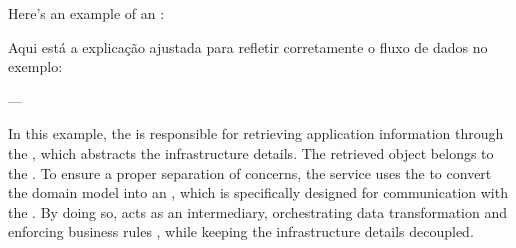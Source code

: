 \documentclass[letterpaper,10pt,english]{sphinxhowto}
\begin{document}
\sphinxAtStartPar
Here’s an example of an :

\begin{sphinxVerbatim}[commandchars=\\\{\}]
 
 
 


      
          

      
          
          
         
\end{sphinxVerbatim}

\sphinxAtStartPar
Aqui está a explicação ajustada para refletir corretamente o fluxo de dados no exemplo:

\sphinxAtStartPar
—

\sphinxAtStartPar
In this example, the  is responsible for retrieving application information through the , which abstracts the infrastructure details.
The retrieved  object belongs to the .
To ensure a proper separation of concerns, the service uses the  to convert the domain model into an , which is specifically designed for communication with the .
By doing so,  acts as an intermediary, orchestrating data transformation and enforcing business rules , while keeping the infrastructure details decoupled.
\end{document}
